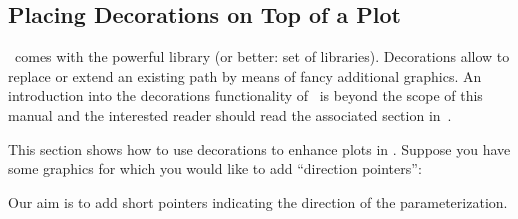 \subsection{Placing Decorations on Top of a Plot}
{
%

\tikzname\ comes with the powerful  library (or better: set of libraries). Decorations allow to replace or extend an existing path by means of fancy additional graphics. An introduction into the decorations functionality of \tikzname\ is beyond the scope of this manual and the interested reader should read the associated section in~\cite{tikz}.

This section shows how to use decorations to enhance plots in \PGFPlots.
Suppose you have some graphics for which you would like to add ``direction pointers'':
\begin{codeexample}[]
\end{codeexample}
\noindent Our aim is to add short pointers indicating the direction of the parameterization.

}
